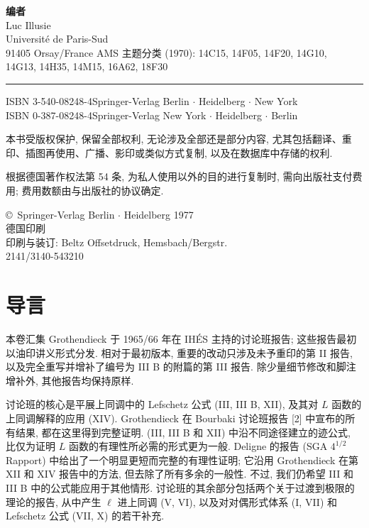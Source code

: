 \thispagestyle{empty}
\noindent\textbf{编者}\\
Luc Illusie\\
Université de Paris-Sud\\
91405 Orsay/France
\vfill
\noindent AMS 主题分类 (1970): 14C15, 14F05, 14F20, 14G10,\\
14G13, 14H35, 14M15, 16A62, 18F30
\par\noindent\rule{\linewidth}{0.4pt}
\noindent ISBN 3-540-08248-4\quad Springer-Verlag Berlin $\cdot$ Heidelberg $\cdot$ New York\\
ISBN 0-387-08248-4\quad Springer-Verlag New York $\cdot$ Heidelberg $\cdot$ Berlin

\noindent 本书受版权保护, 保留全部权利, 无论涉及全部还是部分内容, 尤其包括翻译、重印、插图再使用、广播、影印或类似方式复制, 以及在数据库中存储的权利.

\noindent 根据德国著作权法第 54 条, 为私人使用以外的目的进行复制时, 需向出版社支付费用; 费用数额由与出版社的协议确定.

\noindent \copyright\ Springer-Verlag Berlin $\cdot$ Heidelberg 1977\\
德国印刷\\
印刷与装订: Beltz Offsetdruck, Hemsbach/Bergstr.\\
2141/3140-543210
\clearpage
{}
\section*{导言}

本卷汇集 Grothendieck 于 1965/66 年在 IHÉS 主持的讨论班报告; 这些报告最初以油印讲义形式分发. 相对于最初版本, 重要的改动只涉及未予重印的第 II 报告, 以及完全重写并增补了编号为 III B 的附篇的第 III 报告. 除少量细节修改和脚注增补外, 其他报告均保持原样.

讨论班的核心是平展上同调中的 Lefschetz 公式 (III, III B, XII), 及其对 $L$ 函数的上同调解释的应用 (XIV). Grothendieck 在 Bourbaki 讨论班报告 [2] 中宣布的所有结果, 都在这里得到完整证明. (III, III B 和 XII) 中沿不同途径建立的迹公式, 比仅为证明 $L$ 函数的有理性所必需的形式更为一般. Deligne 的报告 (SGA $4^{1/2}$ Rapport) 中给出了一个明显更短而完整的有理性证明; 它沿用 Grothendieck 在第 XII 和 XIV 报告中的方法, 但去除了所有多余的一般性. 不过, 我们仍希望 III 和 III B 中的公式能应用于其他情形. 讨论班的其余部分包括两个关于过渡到极限的理论的报告, 从中产生 $\ell$ 进上同调 (V, VI), 以及对对偶形式体系 (I, VII) 和 Lefschetz 公式 (VII, X) 的若干补充.

